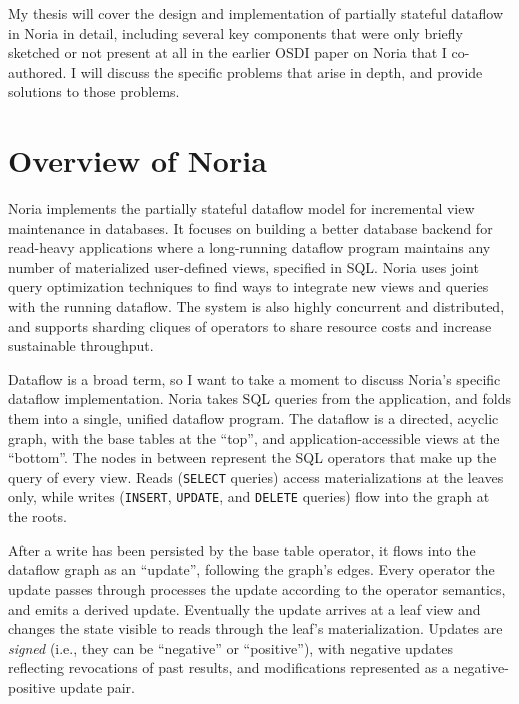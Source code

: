 \documentclass[fontsize=12pt,paper=letter]{scrartcl}
\begin{document}
My thesis will cover the design and implementation of partially stateful
dataflow in Noria in detail, including several key components that were only
briefly sketched or not present at all in the earlier OSDI paper on
Noria\cite{noria} that I co-authored. I will discuss the specific problems that
arise in depth, and provide solutions to those problems.

\section{Overview of Noria}

Noria implements the partially stateful dataflow model for incremental view
maintenance in databases. It focuses on building a better database backend for
read-heavy applications where a long-running dataflow program maintains any
number of materialized user-defined views, specified in SQL. Noria uses joint
query optimization techniques to find ways to integrate new views and queries
with the running dataflow. The system is also highly concurrent and distributed,
and supports sharding cliques of operators to share resource costs and increase
sustainable throughput.

Dataflow is a broad term, so I want to take a moment to discuss Noria's specific
dataflow implementation. Noria takes SQL queries from the application, and folds
them into a single, unified dataflow program. The dataflow is a directed,
acyclic graph, with the base tables at the ``top'', and application-accessible
views at the ``bottom''. The nodes in between represent the SQL operators that
make up the query of every view. Reads (\texttt{SELECT} queries) access
materializations at the leaves only, while writes (\texttt{INSERT},
\texttt{UPDATE}, and \texttt{DELETE} queries) flow into the graph at the roots.

After a write has been persisted by the base table operator, it flows into the
dataflow graph as an ``update'', following the graph's edges. Every operator the
update passes through processes the update according to the operator semantics,
and emits a derived update. Eventually the update arrives at a leaf view and
changes the state visible to reads through the leaf's materialization. Updates
are \emph{signed} (i.e., they can be ``negative'' or ``positive''), with
negative updates reflecting revocations of past results, and modifications
represented as a negative-positive update pair.

\begin{comment}
My primary work on the paper revolved around the implementation of
partial state, including much of the core dataflow fabric.
\end{comment}
\end{document}
